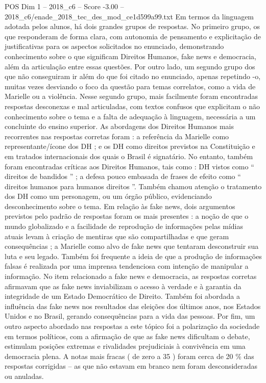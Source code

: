 \begin{textsample}{POS Dim 1 – 2018\_c6 – Score -3.00 – 2018\_c6/enade\_2018\_tec\_des\_mod\_ce1d599a99.txt}
Em termos da linguagem adotada pelos alunos, há dois grandes grupos de respostas.
No primeiro grupo, os que responderam de forma clara, com autonomia de pensamento e explicitação de justificativas para os aspectos solicitados no enunciado, demonstrando conhecimento sobre o que significam Direitos Humanos, fake news e democracia, além da articulação entre essas questões.
Por outro lado, um segundo grupo dos que não conseguiram ir além do que foi citado no enunciado, apenas repetindo -o, muitas vezes desviando o foco da questão para temas correlatos, como a vida de Marielle ou a violência.
Nesse segundo grupo, mais facilmente foram encontradas respostas desconexas e mal articuladas, com textos confusos que explicitam o não conhecimento sobre o tema e a falta de adequação à linguagem, necessária a um concluinte do ensino superior.
As abordagens dos Direitos Humanos mais recorrentes nas respostas corretas foram : a referência da Marielle como representante/ícone dos DH ; e os DH como direitos previstos na Constituição e em tratados internacionais dos quais o Brasil é signatário.
No entanto, também foram encontradas críticas aos Direitos Humanos, tais como : DH vistos como “ direitos de bandidos ” ; a defesa pouco embasada de frases de efeito como “ direitos humanos para humanos direitos ”.
Também chamou atenção o tratamento dos DH como um personagem, ou um órgão público, evidenciando desconhecimento sobre o tema.
Em relação às fake news, dois argumentos previstos pelo padrão de respostas foram os mais presentes : a noção de que o mundo globalizado e a facilidade de reprodução de informações pelas mídias atuais levam à criação de mentiras que são compartilhadas e que geram consequências ; a Marielle como alvo de fake news que tentaram desconstruir sua luta e seu legado.
Também foi frequente a ideia de que a produção de informações falsas é realizada por uma imprensa tendenciosa com intenção de manipular a informação.
No item relacionado a fake news e democracia, as respostas corretas afirmavam que as fake news inviabilizam o acesso à verdade e à garantia da integridade de um Estado Democrático de Direito.
Também foi abordada a influência das fake news nos resultados das eleições dos últimos anos, nos Estados Unidos e no Brasil, gerando consequências para a vida das pessoas.
Por fim, um outro aspecto abordado nas respostas a este tópico foi a polarização da sociedade em termos políticos, com a afirmação de que as fake news dificultam o debate, estimulam posições extremas e rivalidades prejudiciais à convivência em uma democracia plena.
A notas mais fracas ( de zero a 35 ) foram cerca de 20 \% das respostas corrigidas – as que não estavam em branco nem foram desconsideradas ou anuladas.

\end{textsample}
